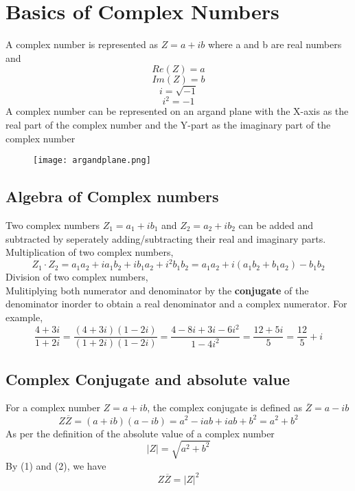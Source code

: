 \documentclass{article}
\begin{document}
\section*{Basics of Complex Numbers}
A complex number is represented as $Z = a + i b$ where a and b are real numbers and \begin{equation*} Re(Z)=a \end{equation*} \begin{equation*} Im(Z)=b \end{equation*}
\begin{equation*} i = \sqrt{-1} \end{equation*}
\begin{equation*} i^{2} = -1 \end{equation*}
A complex number can be represented on an argand plane with the X-axis as the real part of the complex number and the Y-part as the imaginary part of the complex number\\[2pt]
\begin{figure}[h]
    \centering
    \texttt{[image: argandplane.png]}
    \end{figure}
\subsection*{Algebra of Complex numbers}
Two complex numbers $Z_1 = a_1 + i b_1$ and $Z_2 = a_2 + i b_2$ can be added and subtracted by seperately adding/subtracting their real and imaginary parts. \\
Multiplication of two complex numbers,
\begin{equation*} Z_1 \cdot Z_2 = a_1 a_2 + i a_1 b_2 + i b_1 a_2 + i^{2} b_1 b_2 = a_1 a_2 + i (a_1 b_2 + b_1 a_2) - b_1 b_2  \end{equation*}
Division of two complex numbers, \\
Mulitiplying both numerator and denominator by the \textbf{conjugate} of the denominator inorder to obtain a real denominator and a complex numerator.
For example,
\begin{equation*} \frac{4+3i}{1+2i} = \frac{(4+3i)(1-2i)}{(1+2i)(1-2i)} = \frac{4-8i+3i-6i^2}{1-4i^2} = \frac{12+5i}{5} = \frac{12}{5} + i \end{equation*}
\subsection*{Complex Conjugate and absolute value}
For a complex number $Z = a + ib$, the complex conjugate is defined as $\overline{Z} = a - ib$ 
\begin{equation} Z\overline{Z} = (a+ib)(a-ib) = a^{2} - i ab + i ab + b^{2} = a^{2} + b^{2}\end{equation}
As per the definition of the absolute value of a complex number
\begin{equation} |Z| = \sqrt{a^2 + b^2} \end{equation} 
By (1) and (2), we have
\begin{equation*} Z\overline{Z} = |Z|^{2} \end{equation*}
\end{document}
